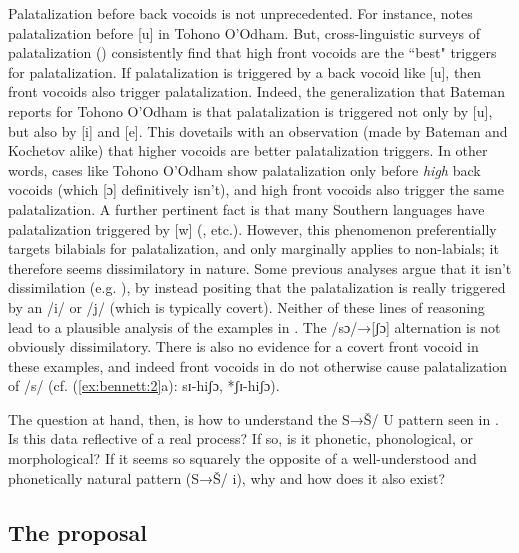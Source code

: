 Palatalization before back vocoids is not unprecedented. For instance, \citet[68]{Bateman:2007aa} notes palatalization before [u] in Tohono O’Odham. But, cross-linguistic surveys of palatalization (\citealt{Bateman:2007aa,Kochetov2011}) consistently find that high front vocoids are the ``best" triggers for palatalization. If palatalization is triggered by a back vocoid like [u], then front vocoids also trigger palatalization. Indeed, the generalization that Bateman reports for Tohono O’Odham is that palatalization is triggered not only by [u], but also by [i] and [e]. This dovetails with an observation (made by Bateman and Kochetov alike) that higher vocoids are better palatalization triggers. In other words, cases like Tohono O’Odham show palatalization only before \textit{high} back vocoids (which [ɔ] definitively isn’t), and high front vocoids also trigger the same palatalization.
A further pertinent fact is that many Southern  languages have palatalization triggered by [w] (\citealt{Louw1975,Ohala1978,Herbert1990,Bennett2015,Bennett&Braver2016}, etc.).  However, this phenomenon preferentially targets bilabials for palatalization, and only marginally applies to non-labials; it therefore seems dissimilatory in nature. Some previous analyses argue that it isn’t dissimilation (e.g. \citealt{Kotze&Zerbian2008}), by instead positing that the palatalization is really triggered by an /i/ or /j/ (which is typically covert). Neither of these lines of reasoning lead to a plausible analysis of the  examples in . The /sɔ/→[ʃɔ] alternation is not obviously dissimilatory. There is also no evidence for a covert front vocoid in these examples, and indeed front vocoids in  do not otherwise cause palatalization of /s/ (cf. (\ref{ex:bennett:2}a): sɪ-hiʃɔ, *ʃɪ-hiʃɔ).

The question at hand, then, is how to understand the S→Š/ {\longrule} U pattern seen in . Is this data reflective of a real process? If so, is it phonetic, phonological, or morphological? If it seems so squarely the opposite of a well-understood and phonetically natural pattern (S→Š/ {\longrule} i), why and how does it also exist?

\subsection{The proposal}\label{sec:bennett:1.2}

